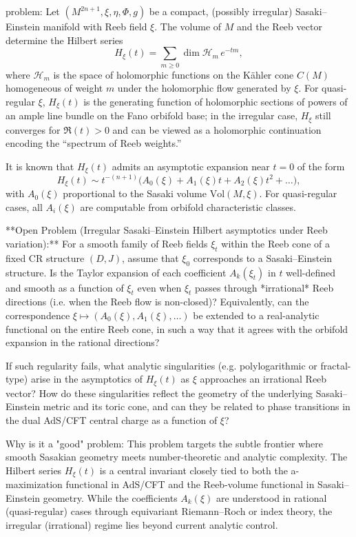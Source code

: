 problem:  
Let $(M^{2n+1}, \xi, \eta, \Phi, g)$ be a compact, (possibly irregular) Sasaki–Einstein manifold with Reeb field $\xi$. The volume of $M$ and the Reeb vector determine the Hilbert series
\[
H_\xi(t) = \sum_{m\ge 0} \dim \mathcal{H}_m\, e^{-tm},
\]
where $\mathcal{H}_m$ is the space of holomorphic functions on the Kähler cone $C(M)$ homogeneous of weight $m$ under the holomorphic flow generated by $\xi$.  
For quasi-regular $\xi$, $H_\xi(t)$ is the generating function of holomorphic sections of powers of an ample line bundle on the Fano orbifold base; in the irregular case, $H_\xi$ still converges for $\Re(t)>0$ and can be viewed as a holomorphic continuation encoding the “spectrum of Reeb weights.”  

It is known that $H_\xi(t)$ admits an asymptotic expansion near $t=0$ of the form
\[
H_\xi(t) \sim t^{-(n+1)}\big(A_0(\xi) + A_1(\xi)t + A_2(\xi)t^2 + \dots \big),
\]
with $A_0(\xi)$ proportional to the Sasaki volume $\mathrm{Vol}(M,\xi)$. For quasi-regular cases, all $A_i(\xi)$ are computable from orbifold characteristic classes.  

**Open Problem (Irregular Sasaki–Einstein Hilbert asymptotics under Reeb variation):**  
For a smooth family of Reeb fields $\xi_t$ within the Reeb cone of a fixed CR structure $(D,J)$, assume that $\xi_0$ corresponds to a Sasaki–Einstein structure.  
Is the Taylor expansion of each coefficient $A_k(\xi_t)$ in $t$ well-defined and smooth as a function of $\xi_t$ even when $\xi_t$ passes through *irrational* Reeb directions (i.e. when the Reeb flow is non-closed)?  
Equivalently, can the correspondence $\xi \mapsto (A_0(\xi),A_1(\xi),\dots)$ be extended to a real-analytic functional on the entire Reeb cone, in such a way that it agrees with the orbifold expansion in the rational directions?  

If such regularity fails, what analytic singularities (e.g. polylogarithmic or fractal-type) arise in the asymptotics of $H_\xi(t)$ as $\xi$ approaches an irrational Reeb vector?  
How do these singularities reflect the geometry of the underlying Sasaki–Einstein metric and its toric cone, and can they be related to phase transitions in the dual AdS/CFT central charge as a function of $\xi$?

Why is it a "good" problem:  
This problem targets the subtle frontier where smooth Sasakian geometry meets number-theoretic and analytic complexity. The Hilbert series $H_\xi(t)$ is a central invariant closely tied to both the a-maximization functional in AdS/CFT and the Reeb-volume functional in Sasaki–Einstein geometry. While the coefficients $A_k(\xi)$ are understood in rational (quasi-regular) cases through equivariant Riemann–Roch or index theory, the irregular (irrational) regime lies beyond current analytic control.  

